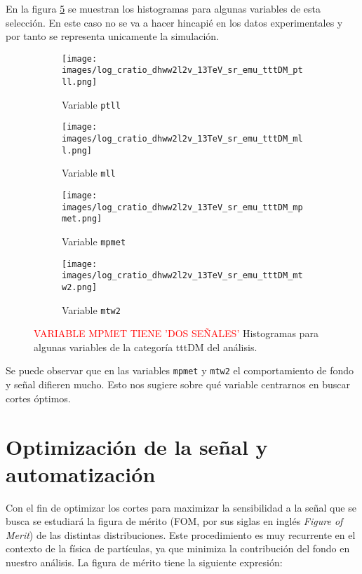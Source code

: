 En la figura \ref{fig:Stack_PreseleccionAN} se muestran los histogramas para algunas variables de esta selección. En este caso no se va a hacer hincapié en los datos experimentales y por tanto se representa unicamente la simulación.\newpage
\begin{figure}[h!]
     \centering
     \begin{subfigure}[b]{0.43\textwidth}
         \centering
         \texttt{[image: images/log\_cratio\_dhww2l2v\_13TeV\_sr\_emu\_tttDM\_ptll.png]}
         \caption{Variable \texttt{ptll}}
         \label{fig:stack_tttDM_ptll}
     \end{subfigure}
     \begin{subfigure}[b]{0.43\textwidth}
         \centering
         \texttt{[image: images/log\_cratio\_dhww2l2v\_13TeV\_sr\_emu\_tttDM\_mll.png]}
         \caption{Variable \texttt{mll}}
         \label{fig:stack_tttDM_mll}
     \end{subfigure}
     \hfill
          \begin{subfigure}[b]{0.43\textwidth}
         \centering
         \texttt{[image: images/log\_cratio\_dhww2l2v\_13TeV\_sr\_emu\_tttDM\_mpmet.png]}
         \caption{Variable \texttt{mpmet}}
         \label{fig:stack_tttDM_mpmet}
     \end{subfigure}
          \begin{subfigure}[b]{0.43\textwidth}
         \centering
         \texttt{[image: images/log\_cratio\_dhww2l2v\_13TeV\_sr\_emu\_tttDM\_mtw2.png]}
         \caption{Variable \texttt{mtw2}}
         \label{fig:stack_tttDM_mtw2}
     \end{subfigure}
     \caption{\textcolor{red}{VARIABLE MPMET TIENE 'DOS SEÑALES'} Histogramas para algunas variables de la categoría tttDM del análisis. }
     \label{fig:Stack_PreseleccionAN}
\end{figure}

Se puede observar que en las variables \texttt{mpmet} y \texttt{mtw2} el comportamiento de fondo y señal difieren mucho. Esto nos sugiere sobre qué variable centrarnos en buscar cortes óptimos.

\section{Optimización de la señal y automatización}

Con el fin de optimizar los cortes para maximizar la sensibilidad a la señal que se busca se estudiará la figura de mérito (FOM, por sus siglas en inglés \textit{Figure of Merit}) de las distintas distribuciones. Este procedimiento es muy recurrente en el contexto de la física de partículas, ya que minimiza la contribución del fondo en nuestro análisis. La figura de mérito tiene la siguiente expresión:

